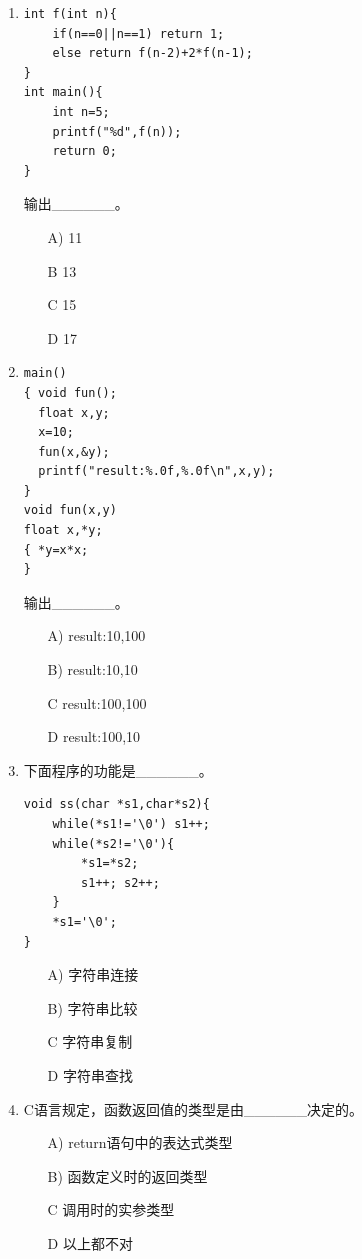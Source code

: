 \documentclass[a4paper,12pt]{article}
\begin{document}
\begin{enumerate}
	\item
	      \begin{verbatim}
int f(int n){
    if(n==0||n==1) return 1;
    else return f(n-2)+2*f(n-1);
}
int main(){
    int n=5;
    printf("%d",f(n));
    return 0;
}
    \end{verbatim}
	      输出\_\_\_\_\_\_。
	      \begin{enumerate}
		      \item[A)] 11
		      \item[B] 13
		      \item[C] 15
		      \item[D] 17
	      \end{enumerate}
	      \vspace{0.3cm}

	\item
	      \begin{verbatim}
main()
{ void fun();
  float x,y;
  x=10;
  fun(x,&y);
  printf("result:%.0f,%.0f\n",x,y);
}
void fun(x,y)
float x,*y;
{ *y=x*x;
}
    \end{verbatim}
	      输出\_\_\_\_\_\_。
	      \begin{enumerate}
		      \item[A)] result:10,100
		      \item[B)] result:10,10
		      \item[C] result:100,100
		      \item[D] result:100,10
	      \end{enumerate}
	      \vspace{0.3cm}

	\item 下面程序的功能是\_\_\_\_\_\_。
	      \begin{verbatim}
void ss(char *s1,char*s2){
    while(*s1!='\0') s1++;
    while(*s2!='\0'){
        *s1=*s2;
        s1++; s2++;
    }
    *s1='\0';
}
    \end{verbatim}
	      \begin{enumerate}
		      \item[A)] 字符串连接
		      \item[B)] 字符串比较
		      \item[C] 字符串复制
		      \item[D] 字符串查找
	      \end{enumerate}
	      \vspace{0.3cm}

	\item C语言规定，函数返回值的类型是由\_\_\_\_\_\_决定的。
	      \begin{enumerate}
		      \item[A)] return语句中的表达式类型
		      \item[B)] 函数定义时的返回类型
		      \item[C] 调用时的实参类型
		      \item[D] 以上都不对
	      \end{enumerate}
	      \vspace{0.3cm}


\end{enumerate}
\end{document}
